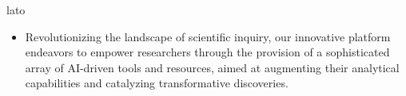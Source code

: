 {lato}\documentclass[10pt,a4paper,ragged2e]{altacv}
\begin{document}
\begin{itemize}
    \item {Revolutionizing the landscape of scientific inquiry, our innovative platform endeavors to empower researchers through the provision of a sophisticated array of AI-driven tools and resources, aimed at augmenting their analytical capabilities and catalyzing transformative discoveries.}
\end{itemize}
\divider

\clearpage
\end{document}
